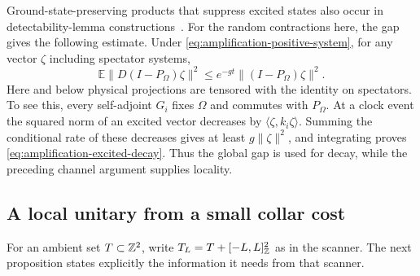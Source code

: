Ground-state-preserving products that suppress excited states also occur
in detectability-lemma constructions~\cite[Section~III]{AnshuAradVidick2016}.
For the random contractions here, the gap gives the following estimate.  Under
\eqref{eq:amplification-positive-system}, for any vector $\zeta$
including spectator systems,
\begin{equation}\label{eq:amplification-excited-decay}
 \mathbb E\|D(I-P_\Omega)\zeta\|^2
 \le e^{-gt}\|(I-P_\Omega)\zeta\|^2.
\end{equation}
Here and below physical projections are tensored with the identity
on spectators.  To see this, every self-adjoint $G_i$ fixes $\Omega$
and commutes with $P_\Omega$.  At a clock event the squared norm of
an excited vector decreases by $\langle\zeta,k_i\zeta\rangle$.
Summing the conditional rate of these decreases gives at least
$g\|\zeta\|^2$, and integrating proves
\eqref{eq:amplification-excited-decay}.  Thus the global gap is
used for decay, while the preceding channel argument supplies locality.

\subsection{A local unitary from a small collar cost}

For an ambient set $T\subset\mathbb Z^2$, write
$T_L=T+[-L,L]^2_{\mathbb Z}$ as in the scanner.  The next proposition
states explicitly the information it needs from that scanner.


